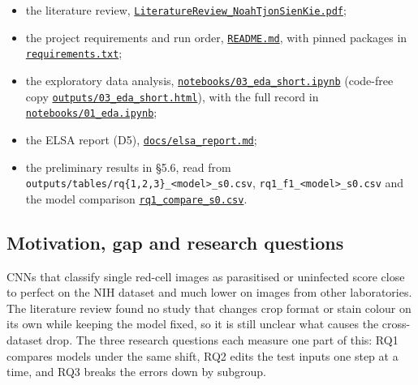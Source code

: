 \documentclass[11pt,a4paper]{article}
\begin{document}
\begin{itemize}
\item the literature review, \href{https://github.com/noahtjonsk/malaria-cross-dataset/blob/main/LiteratureReview_NoahTjonSienKie.pdf}{\texttt{LiteratureReview\_\allowbreak{}NoahTjonSienKie.\allowbreak{}pdf}};
\item the project requirements and run order, \href{https://github.com/noahtjonsk/malaria-cross-dataset/blob/main/README.md}{\texttt{README.\allowbreak{}md}}, with pinned packages in \href{https://github.com/noahtjonsk/malaria-cross-dataset/blob/main/requirements.txt}{\texttt{requirements.\allowbreak{}txt}};
\item the exploratory data analysis, \href{https://github.com/noahtjonsk/malaria-cross-dataset/blob/main/notebooks/03_eda_short.ipynb}{\texttt{notebooks/\allowbreak{}03\_\allowbreak{}eda\_\allowbreak{}short.\allowbreak{}ipynb}} (code-free copy \href{https://github.com/noahtjonsk/malaria-cross-dataset/blob/main/outputs/03_eda_short.html}{\texttt{outputs/\allowbreak{}03\_\allowbreak{}eda\_\allowbreak{}short.\allowbreak{}html}}), with the full record in \href{https://github.com/noahtjonsk/malaria-cross-dataset/blob/main/notebooks/01_eda.ipynb}{\texttt{notebooks/\allowbreak{}01\_\allowbreak{}eda.\allowbreak{}ipynb}};
\item the ELSA report (D5), \href{https://github.com/noahtjonsk/malaria-cross-dataset/blob/main/docs/elsa_report.md}{\texttt{docs/\allowbreak{}elsa\_\allowbreak{}report.\allowbreak{}md}};
\item the preliminary results in \S{}5.6, read from \texttt{outputs/\allowbreak{}tables/\allowbreak{}rq\{1,2,3\}\_\allowbreak{}<model>\_\allowbreak{}s0.\allowbreak{}csv}, \texttt{rq1\_\allowbreak{}f1\_\allowbreak{}<model>\_\allowbreak{}s0.\allowbreak{}csv} and the model comparison \href{https://github.com/noahtjonsk/malaria-cross-dataset/blob/main/outputs/tables/rq1_compare_s0.csv}{\texttt{rq1\_\allowbreak{}compare\_\allowbreak{}s0.\allowbreak{}csv}}.
\end{itemize}

\subsection{Motivation, gap and research questions}

CNNs that classify single red-cell images as parasitised or uninfected score close to perfect on the NIH dataset and much lower on images from other laboratories. The literature review found no study that changes crop format or stain colour on its own while keeping the model fixed, so it is still unclear what causes the cross-dataset drop. The three research questions each measure one part of this: RQ1 compares models under the same shift, RQ2 edits the test inputs one step at a time, and RQ3 breaks the errors down by subgroup.
\end{document}
